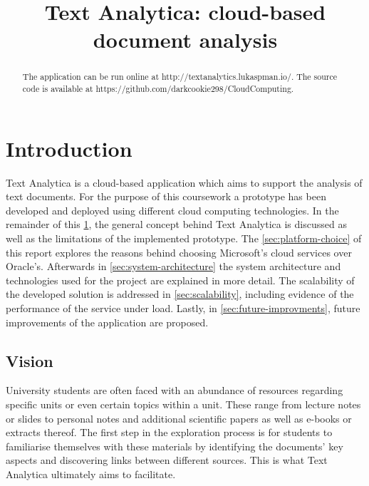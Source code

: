 \documentclass[conference]{IEEEtran}
\begin{document}
\title{Text Analytica: cloud-based document analysis\\}

\author{
\and
{}
}

\maketitle

\begin{abstract}
The application can be run online at http://textanalytics.lukaspman.io/.
The source code is available at https://github.com/darkcookie298/CloudComputing.
\end{abstract}

\section{Introduction}
\label{sec:intro}
Text Analytica is a cloud-based application which aims to support the analysis of text documents. For the purpose of this coursework a prototype has been developed and deployed using different cloud computing technologies. In the remainder of this \cref{sec:intro}, the general concept behind Text Analytica is discussed as well as the limitations of the implemented prototype. The \cref{sec:platform-choice} of this report explores the reasons behind choosing Microsoft’s cloud services over Oracle’s. Afterwards in \cref{sec:system-architecture} the system architecture and technologies used for the project are explained in more detail. The scalability of the developed solution is addressed in \cref{sec:scalability}, including evidence of the performance of the service under load. Lastly, in \cref{sec:future-improvments}, future improvements of the application are proposed.

\subsection{Vision}
University students are often faced with an abundance of resources regarding specific units or even certain topics within a unit. These range from lecture notes or slides to personal notes and additional scientific papers as well as e-books or extracts thereof. The first step in the exploration process is for students to familiarise themselves with these materials by identifying the documents’ key aspects and discovering links between different sources. This is what Text Analytica ultimately aims to facilitate.
\end{document}
